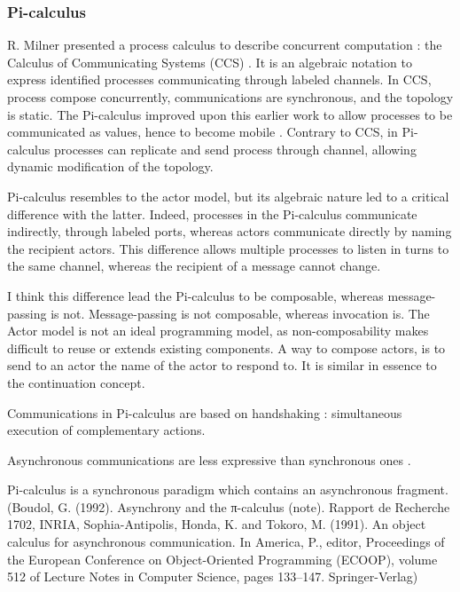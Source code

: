 \subsubsection{Pi-calculus}

R. Milner presented a process calculus to describe concurrent computation : the Calculus of Communicating Systems (CCS) \cite{Milner1975, Milner1980}.
It is an algebraic notation to express identified processes communicating through labeled channels.
In CCS, process compose concurrently, communications are synchronous, and the topology is static.
The Pi-calculus improved upon this earlier work to allow processes to be communicated as values, hence to become mobile \cite{Engberg1986,Milner1992a,Milner1992}.
Contrary to CCS, in Pi-calculus processes can replicate and send process through channel, allowing dynamic modification of the topology.

Pi-calculus resembles to the actor model, but its algebraic nature led to a critical difference with the latter.
Indeed, processes in the Pi-calculus communicate indirectly, through labeled ports, whereas actors communicate directly by naming the recipient actors.
This difference allows multiple processes to listen in turns to the same channel, whereas the recipient of a message cannot change.

I think this difference lead the Pi-calculus to be composable, whereas message-passing is not.
Message-passing is not composable, whereas invocation is.
The Actor model is not an ideal programming model, as non-composability makes difficult to reuse or extends existing components.
A way to compose actors, is to send to an actor the name of the actor to respond to.
It is similar in essence to the continuation concept.

Communications in Pi-calculus are based on handshaking : simultaneous execution of complementary actions.


Asynchronous communications are less expressive than synchronous ones \cite{PALAMIDESSI2003}.

Pi-calculus is a synchronous paradigm which contains an asynchronous fragment.\cite{PALAMIDESSI2003}
(Boudol, G. (1992). Asynchrony and the π-calculus (note). Rapport de Recherche  1702, INRIA, Sophia-Antipolis,
Honda, K. and Tokoro, M. (1991).  An object calculus for asynchronous communication. In America, P., editor, Proceedings of the European Conference on Object-Oriented Programming (ECOOP), volume 512 of Lecture Notes in Computer Science, pages 133–147. Springer-Verlag)


